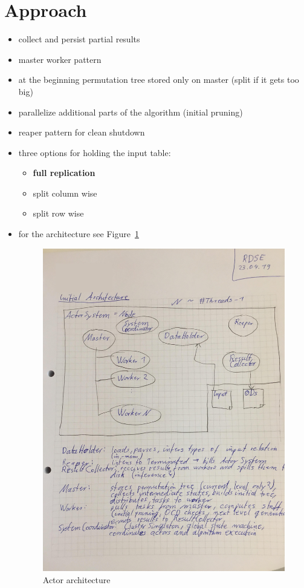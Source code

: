 
\section{Approach}\label{sec:approach}


\begin{itemize}
	\item collect and persist partial results
	\item master worker pattern
	\item at the beginning permutation tree stored only on master (split if it gets too big)
	\item parallelize additional parts of the algorithm (initial pruning)
	\item reaper pattern for clean shutdown
	\item three options for holding the input table:
	\begin{itemize}
		\item \textbf{full replication}
		\item split column wise
		\item split row wise
	\end{itemize}
  \item for the architecture see Figure~\ref{fig:architecture}

  \begin{figure}[p]
    \centering
    \includegraphics[width=\linewidth]{pictures/actor-architecture.jpg}
    \caption{Actor architecture}
    \label{fig:architecture}
  \end{figure}
	
\end{itemize}